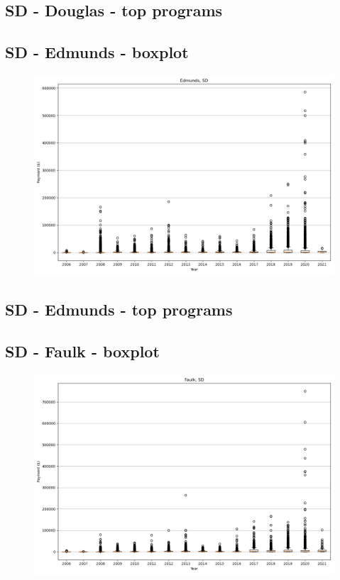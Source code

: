 \subsection*{SD - Douglas - top programs}

\newpage
\subsection*{SD - Edmunds - boxplot}
\begin{figure}[h]
\centering
\includegraphics[width=7in]{../output/boxplots/counties/Edmunds-SD_boxplot.png}
\end{figure}


\subsection*{SD - Edmunds - top programs}

\newpage
\subsection*{SD - Faulk - boxplot}
\begin{figure}[h]
\centering
\includegraphics[width=7in]{../output/boxplots/counties/Faulk-SD_boxplot.png}
\end{figure}


